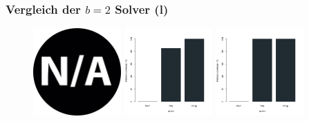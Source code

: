 \documentclass{beamer}
\begin{document}
\begin{frame}
\frametitle{Vergleich der $b = 2$ Solver (l)}

\begin{figure}
\centering
\includegraphics[width=0.3\textwidth]{images/na.png}
\includegraphics[width=0.3\textwidth]{images/solver_instance_coverage_b=2_l_1800s.png}
\includegraphics[width=0.3\textwidth]{images/solver_instance_coverage_b=2_l_2700s.png}
\caption*{\textsc{Zeitlimit} $15min$ $\quad\quad\quad$ \textsc{Zeitlimit} $30min$ $\quad\quad\quad$ \textsc{Zeitlimit} $45min$}
\begin{subfigure}[b]{0.3\textwidth}
\centering
{}

\end{subfigure}
\end{figure}
\end{frame}
\end{document}
